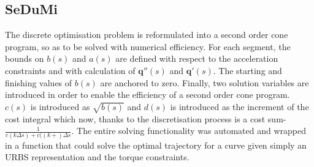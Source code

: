 \subsection{SeDuMi}

The discrete optimisation problem is reformulated into a second order cone program, so as to be solved with numerical efficiency. For each segment, the bounds on $b(s)$ and $a(s)$ are defined with respect to the acceleration constraints and with calculation of $\textbf{q}''(s)$ and $\textbf{q}'(s)$. The starting and finishing values of $b(s)$ are anchored to zero. Finally, two solution variables are introduced in order to enable the efficiency of a second order cone program. $c(s)$ is introduced as $\sqrt{b(s)}$ and $d(s)$ is introduced as the increment of the cost integral which now, thanks to the discretisation process is a cost sum- $\frac{1}{c(k\Delta s) + c((k+)\Delta s}$.
The entire solving functionality was automated and wrapped in a function that could solve the optimal trajectory for a curve  given simply an URBS representation and the torque constraints.
